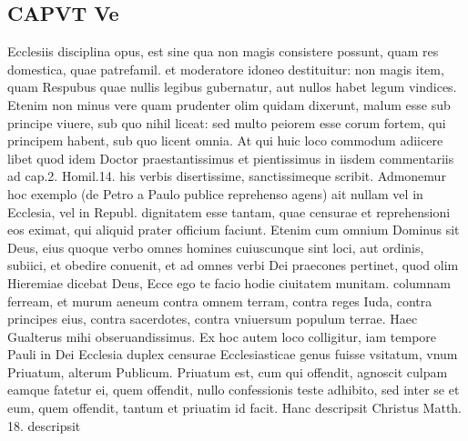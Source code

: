 \documentclass{article}
\begin{document}
\begin{pages}
\section*{CAPVT  Ve }
\marginpar{[ p.319 ]}\pstart Ecclesiis disciplina opus, est sine qua non magis consistere possunt, quam res domestica, quae patrefamil. et moderatore idoneo destituitur: non magis item, quam Respubus quae nullis legibus gubernatur, aut nullos habet legum vindices. Etenim non minus vere quam prudenter olim quidam dixerunt, malum esse sub principe viuere, sub quo nihil liceat: sed multo peiorem esse corum fortem, qui principem habent, sub quo licent omnia. At qui huic loco commodum adiicere libet quod idem Doctor praestantissimus et pientissimus in iisdem commentariis ad cap.2. Homil.14. his verbis disertissime, sanctissimeque scribit. Admonemur hoc exemplo (de Petro a Paulo publice reprehenso agens) ait nullam vel in Ecclesia, vel in Republ. dignitatem esse tantam, quae censurae et reprehensioni eos eximat, qui aliquid prater officium faciunt. Etenim cum omnium Dominus sit Deus, eius quoque verbo omnes homines cuiuscunque sint loci, aut ordinis, subiici, et obedire conuenit, et ad omnes verbi Dei praecones pertinet, quod olim Hieremiae dicebat Deus, Ecce ego te facio hodie ciuitatem munitam. columnam ferream, et murum aeneum contra omnem terram, contra reges Iuda, contra principes eius, contra sacerdotes, contra vniuersum populum terrae. Haec Gualterus mihi obseruandissimus. Ex hoc autem loco colligitur, iam tempore Pauli in Dei Ecclesia duplex censurae Ecclesiasticae genus fuisse vsitatum, vnum Priuatum, alterum Publicum. Priuatum est, cum qui offendit, agnoscit culpam eamque fatetur ei, quem offendit, nullo confessionis teste adhibito, sed inter se et eum, quem offendit, tantum et priuatim id facit. Hanc descripsit Christus Matth. 18. descripsit  \pend

\end{pages}
\end{document}

